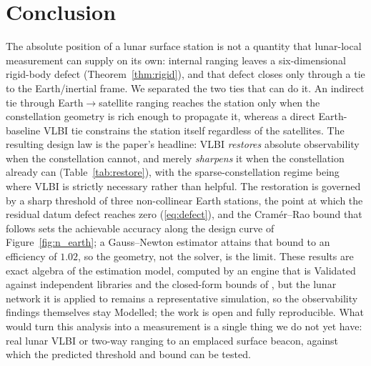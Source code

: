 \section{Conclusion}
\label{sec:conclusion}

The absolute position of a lunar surface station is not a quantity that lunar-local measurement can supply on its own: internal ranging leaves a six-dimensional rigid-body defect (Theorem~\ref{thm:rigid}), and that defect closes only through a tie to the Earth/inertial frame. We separated the two ties that can do it. An indirect tie through Earth$\to$satellite ranging reaches the station only when the constellation geometry is rich enough to propagate it, whereas a direct Earth-baseline VLBI tie constrains the station itself regardless of the satellites. The resulting design law is the paper's headline: VLBI \emph{restores} absolute observability when the constellation cannot, and merely \emph{sharpens} it when the constellation already can (Table~\ref{tab:restore}), with the sparse-constellation regime being where VLBI is strictly necessary rather than helpful. The restoration is governed by a sharp threshold of three non-collinear Earth stations, the point at which the residual datum defect reaches zero (\eqref{eq:defect}), and the Cram\'er--Rao bound that follows sets the achievable accuracy along the design curve of Figure~\ref{fig:n_earth}; a Gauss--Newton estimator attains that bound to an efficiency of $1.02$, so the geometry, not the solver, is the limit. These results are exact algebra of the estimation model, computed by an engine that is Validated against independent libraries and the closed-form bounds of \citet{kay1993}, but the lunar network it is applied to remains a representative simulation, so the observability findings themselves stay Modelled; the work is open and fully reproducible. What would turn this analysis into a measurement is a single thing we do not yet have: real lunar VLBI or two-way ranging to an emplaced surface beacon, against which the predicted threshold and bound can be tested.
